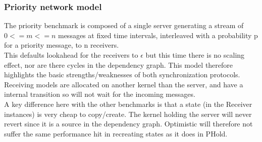 \subsubsection{Priority network model}
The priority benchmark is composed of a single server generating a stream of $0<=m<=n$ messages at fixed time intervals, interleaved with a probability p for a priority message, to n receivers. \\ This defaults lookahead for the receivers to $\epsilon$ but this time there is no scaling effect, nor are there cycles in the dependency graph. This model therefore highlights the basic strengths/weaknesses of both synchronization protocols. Receiving models are allocated on another kernel than the server, and have a internal transition so will not wait for the incoming messages. 
 \\
A key difference here with the other benchmarks is that a state (in the Receiver instances) is very cheap to copy/create. The kernel holding the server will never revert since it is a source in the dependency graph. Optimistic will therefore not suffer the same performance hit in recreating states as it does in PHold. 

